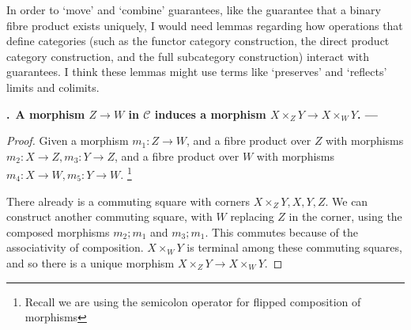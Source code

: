 \documentclass[11pt,noamsfonts]{amsart}
\newcommand{\pointheader}{\vspace{2mm}\noindent\refstepcounter{section}\textbf{\thesection.}}
\newcommand{\tpoint}[1]{\pointheader~{\bf #1. ---}}
\begin{document}
In order to `move' and `combine' guarantees, like the guarantee that a binary fibre product exists uniquely, I would need lemmas regarding how operations that define categories (such as the functor category construction, the direct product category construction, and the full subcategory construction) interact with guarantees. I think these lemmas might use terms like `preserves' and `reflects' limits and colimits.




\tpoint{A morphism \(Z \to W\) in \(\mathcal{C}\) induces a morphism  \(X \times_{Z} Y \to X \times_{W} Y \)}

\begin{proof}
Given a morphism \(m_1 : Z \to W\), and a fibre product over \(Z\) with morphisms \(m_2 : X \to Z, m_3 : Y \to Z\), and a fibre product over \(W\) with morphisms \(m_4 : X \to W , m_5 : Y \to W\).
 \footnote{Recall we are using the semicolon operator for flipped composition of morphisms}

There already is a commuting square with corners \( X \times_Z Y, X, Y, Z \). We can construct another commuting square, with \(W\) replacing \(Z\) in the corner, using the composed morphisms \( m_2 ; m_1 \) and \( m_3 ; m_1 \).
This commutes because of the associativity of composition. \( X \times_W Y \) is terminal among these commuting squares, and so there is a unique morphism  \(X \times_Z Y \to X \times_W Y \).


\end{proof}
\end{document}
